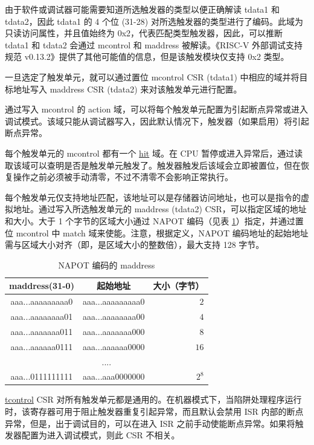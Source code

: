\documentclass[main\_\_CN.tex]{subfiles}
\begin{document}
由于软件或调试器可能需要知道所选触发器的类型以便正确解读 tdata1 和 tdata2，因此 tdata1 的 4 个位 (31-28) 对所选触发器的类型进行了编码。此域为只读访问属性，并且值始终为 0x2，代表匹配类型触发器，因此，可以推断 tdata1 和 tdata2 会通过 mcontrol 和 maddress 被解读。《RISC-V 外部调试支持规范 v0.13.2》提供了其他可能值的信息，但是该触发模块仅支持 0x2 类型。

一旦选定了触发单元，就可以通过置位 mcontrol CSR (tdata1) 中相应的域并将目标地址写入 maddress CSR (tdata2) 来对该触发单元进行配置。

通过写入 mcontrol 的 action 域，可以将每个触发单元配置为引起断点异常或进入调试模式。该域只能从调试器写入，因此默认情况下，触发器（如果启用）将引起断点异常。

每个触发单元的 mcontrol 都有一个 \hyperref[fielddesc:MCONTROLHIT]{hit} 域。在 CPU 暂停或进入异常后，通过读取该域可以查明是否是触发单元触发了。触发器触发后该域会立即被置位，但在恢复操作之前必须被手动清零，不过不清零不会影响正常执行。

每个触发单元仅支持地址匹配，该地址可以是存储器访问地址，也可以是指令的虚拟地址。通过写入所选触发单元的 maddress (tdata2) CSR，可以指定区域的地址和大小。大于 1 个字节的区域大小通过 NAPOT 编码（见表 \ref{tab:riscvcpu-hwt-table}）指定，并通过置位 mcontrol 中 match 域来使能。注意，根据定义，NAPOT 编码地址的起始地址需与区域大小对齐（即，是区域大小的整数倍），最大支持 128 字节。

\begin{longtable}{ | c | c | r | }
\caption{NAPOT 编码的 maddress} \label{tab:riscvcpu-hwt-table}
\\ \hline
\rowcolor{lightgray}
maddress(31-0) & 起始地址 & 大小（字节） \\ \hline
aaa...aaaaaaaaa0 & aaa...aaaaaaaaa0 & $2$ \\ \hline
aaa...aaaaaaaa01 & aaa...aaaaaaaa00 & $4$ \\ \hline
aaa...aaaaaaa011 & aaa...aaaaaaa000 & $8$ \\ \hline
aaa...aaaaaa0111 & aaa...aaaaaa0000 & $16$ \\ \hline
\multicolumn{3}{c}{....} \\ \hline
aaa...0111111111 & aaa...aaa0000000 & $2^{8}$ \\ \hline
\end{longtable}

\hyperref[regdesc:TCONTROL]{tcontrol} CSR 对所有触发单元都是通用的。在机器模式下，当陷阱处理程序运行时，该寄存器可用于阻止触发器重复引起异常，而且默认会禁用 ISR 内部的断点异常，但是，出于调试目的，可以在进入 ISR 之前手动使能断点异常。如果将触发器配置为进入调试模式，则此 CSR 不相关。
\end{document}
